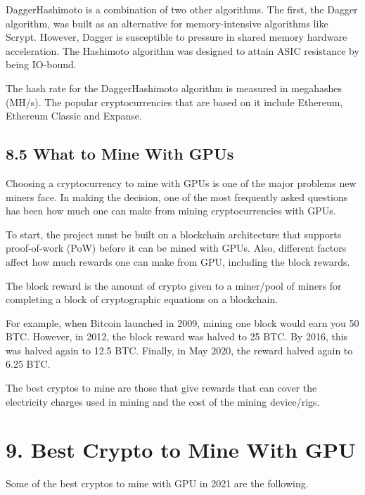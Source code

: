 DaggerHashimoto is a combination of two other algorithms. The first, the Dagger algorithm, was built as an alternative for memory-intensive algorithms like Scrypt. However, Dagger is susceptible to pressure in shared memory hardware acceleration. The Hashimoto algorithm was designed to attain ASIC resistance by being IO-bound.\vspace{.3 cm}

The hash rate for the DaggerHashimoto algorithm is measured in megahashes (MH/s). The popular cryptocurrencies that are based on it include Ethereum, Ethereum Classic and Expanse.\vspace{.3 cm}

\subsection*{8.5 What to Mine With GPUs}
Choosing a cryptocurrency to mine with GPUs is one of the major problems new miners face. In making the decision, one of the most frequently asked questions has been how much one can make from mining cryptocurrencies with GPUs.\vspace{.3 cm}

To start, the project must be built on a blockchain architecture that supports proof-of-work (PoW) before it can be mined with GPUs. Also, different factors affect how much rewards one can make from GPU, including the block rewards.\vspace{.3 cm}

The block reward is the amount of crypto given to a miner/pool of miners for completing a block of cryptographic equations on a blockchain. \vspace{.3 cm}

For example, when Bitcoin launched in 2009, mining one block would earn you 50 BTC. However, in 2012, the block reward was halved to 25 BTC. By 2016, this was halved again to 12.5 BTC. Finally, in May 2020, the reward halved again to 6.25 BTC.\vspace{.3 cm}

The best cryptos to mine are those that give rewards that can cover the electricity charges used in mining and the cost of the mining device/rigs.\vspace{.3 cm}

\section*{9. Best Crypto to Mine With GPU}
Some of the best cryptos to mine with GPU in 2021 are the following.

